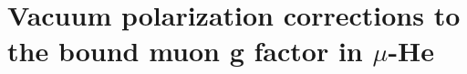 \chapter{Vacuum polarization corrections to the bound muon g factor in $\mu$-He}
\label{ch:muongfac}
 







